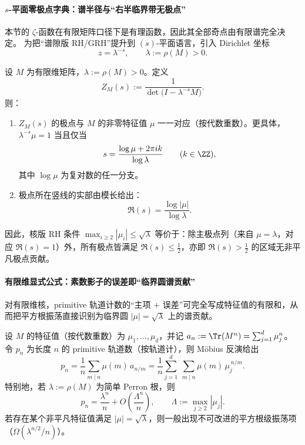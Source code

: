 \paragraph{\texorpdfstring{$s$}{s}-平面零极点字典：谱半径与“右半临界带无极点”}\label{par:s-plane-pole-dictionary}
本节的 \(\zeta\)-函数在有限矩阵口径下是有理函数，因此其全部奇点由有限谱完全决定。
为把“谱隙版 RH/GRH”提升到 \((s)\)-平面语言，引入 Dirichlet 坐标
\[
z=\lambda^{-s},\qquad \lambda:=\rho(M)>0.
\]
\begin{remark}\label{prop:s-plane-spectrum-poles}
设 \(M\) 为有限维矩阵，\(\lambda:=\rho(M)>0\)。定义
\[
Z_M(s):=\frac{1}{\det\!\bigl(I-\lambda^{-s}M\bigr)}.
\]
则：
\begin{enumerate}
  \item \(Z_M(s)\) 的极点与 \(M\) 的非零特征值 \(\mu\) 一一对应（按代数重数）。更具体，\(\lambda^{-s}\mu=1\) 当且仅当
  \[
  s=\frac{\log\mu+2\pi i k}{\log\lambda}\qquad(k\in\ZZ),
  \]
  其中 \(\log\mu\) 为复对数的任一分支。
  \item 极点所在竖线的实部由模长给出：
  \[
  \Re(s)=\frac{\log|\mu|}{\log\lambda}.
  \]
\end{enumerate}
因此，核版 RH 条件
\(
\max_{i\ge 2}|\mu_i|\le \sqrt{\lambda}
\)
等价于：除主极点列（来自 \(\mu=\lambda\)，对应 \(\Re(s)=1\)）外，所有极点皆满足 \(\Re(s)\le \tfrac12\)，亦即 \(\Re(s)>\tfrac12\) 的区域无非平凡极点贡献。
\end{remark}

\paragraph{有限维显式公式：素数影子的误差即“临界圆谱贡献”}\label{par:finite-explicit-formula}
对有限维核，primitive 轨道计数的“主项 + 误差”可完全写成特征值的有限和，从而把平方根振荡直接识别为临界圆 \(|\mu|=\sqrt{\lambda}\) 上的谱贡献。
\begin{remark}[有限维显式公式模板]\label{prop:finite-dimensional-explicit-formula}
设 \(M\) 的特征值（按代数重数）为 \(\mu_1,\dots,\mu_d\)，并记
\(
a_n:=\Tr(M^n)=\sum_{j=1}^d \mu_j^n
\)。
令 \(p_n\) 为长度 \(n\) 的 primitive 轨道数（按轨道计），则 Möbius 反演给出
\[
p_n=\frac{1}{n}\sum_{m\mid n}\mu(m)\,a_{n/m}
=\frac{1}{n}\sum_{j=1}^d\ \sum_{m\mid n}\mu(m)\,\mu_j^{\,n/m}.
\]
特别地，若 \(\lambda:=\rho(M)\) 为简单 Perron 根，则
\[
p_n=\frac{\lambda^n}{n}+O\!\left(\frac{\Lambda^n}{n}\right),
\qquad
\Lambda:=\max_{j\ge 2}|\mu_j|.
\]
若存在某个非平凡特征值满足 \(|\mu|=\sqrt{\lambda}\)，则一般出现不可改进的平方根级振荡项（\(\Omega(\lambda^{n/2}/n)\)）。
\end{remark}

